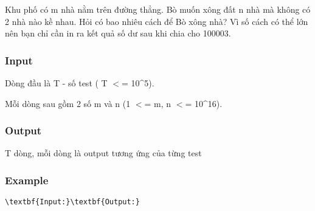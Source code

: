 

Khu phố có m nhà nằm trên đường thẳng. Bò muốn xông đất n nhà mà không có 2 nhà nào kề nhau. Hỏi có bao nhiêu cách để Bò xông nhà? Vì số cách có thể lớn nên bạn chỉ cần in ra kết quả số dư sau khi chia cho 100003.

\subsubsection{Input}

Dòng đầu là T - số test ( T $<$= 10\textasciicircum5).

Mỗi dòng sau gồm 2 số m và n (1 $<$= m, n $<$= 10\textasciicircum16).

\subsubsection{Output}

T dòng, mỗi dòng là output tương ứng của từng test

\subsubsection{Example}
\begin{verbatim}
\textbf{Input:}\textbf{Output:}\end{verbatim}